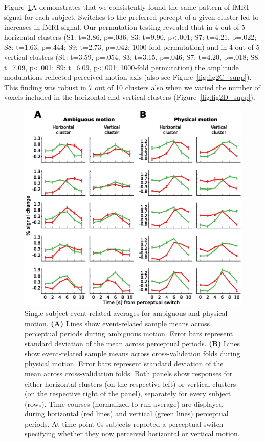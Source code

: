 Figure~\ref{fig:single_subject_results}A demonstrates that we consistently found the same pattern of fMRI signal for each subject. Switches to the preferred percept of a given cluster led to increases in fMRI signal. Our permutation testing revealed that in 4 out of 5 horizontal clusters (S1: t=3.86, p=.036; S3: t=9.90, p\textless.001; S7: t=4.21, p=.022; S8: t=1.63, p=.444; S9: t=2.73, p=.042; 1000-fold permutation) and in 4 out of 5 vertical clusters (S1: t=3.59, p=.054; S3: t=3.15, p=.046; S7: t=4.20, p=.018; S8: t=7.09, p\textless.001; S9: t=6.09, p\textless.001; 1000-fold permutation) the amplitude modulations reflected perceived motion axis (also see Figure~\ref{fig:fig2C_supp}). This finding was robust in 7 out of 10 clusters also when we varied the number of voxels included in the horizontal and vertical clusters (Figure~\ref{fig:fig2D_supp}).

\begin{figure}[htbp!]
\centering
\includegraphics[width=\textwidth]{figures/chapter_03/fig2.eps}
\caption{Single-subject event-related averages for ambiguous and physical motion. \textbf{(A)} Lines show event-related sample means across perceptual periods during ambiguous motion. Error bars represent standard deviation of the mean across perceptual periods. \textbf{(B)} Lines show event-related sample means across cross-validation folds during physical motion. Error bars represent standard deviation of the mean across cross-validation folds. Both panels show responses for either horizontal clusters (on the respective left) or vertical clusters (on the respective right of the panel), separately for every subject (rows). Time courses (normalized to run average) are displayed during horizontal (red lines) and vertical (green lines) perceptual periods. At time point 0s subjects reported a perceptual switch specifying whether they now perceived horizontal or vertical motion.}
\label{fig:single_subject_results}
\end{figure}

